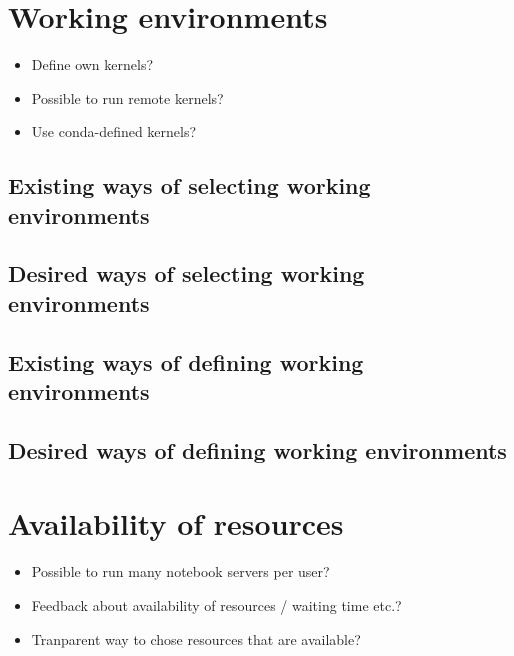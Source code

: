 \documentclass[11pt,a4paper]{article}
\begin{document}

\section{Working environments}
\label{s-working-envs}

\begin{itemize}
  \item Define own kernels?
  \item Possible to run remote kernels?
  \item Use conda-defined kernels?
\end{itemize}

\subsection{Existing ways of selecting working environments}
\label{ss-existing-env-selection}

\subsection{Desired ways of selecting working environments}
\label{ss-desired-env-selection}

\subsection{Existing ways of defining working environments}
\label{ss-existing-env-definition}

\subsection{Desired ways of defining working environments}
\label{ss-desired-env-definition}


\section{Availability of resources}
\label{s-availability-resources}

\begin{itemize}
  \item Possible to run many notebook servers per user?
  \item Feedback about availability of resources / waiting time etc.?
  \item Tranparent way to chose resources that are available?
\end{itemize}
\end{document}
